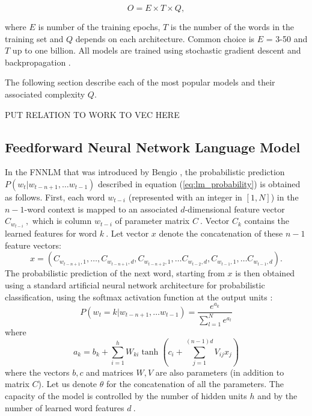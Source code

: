 \begin{center}
\begin{equation} O = E \times T \times Q,   \end{equation}
\end{center}

where $E$ is number of the training epochs, $T$ is the number of the words in
the training set and $Q$ depends on each architecture. Common choice is $E$ = 3-50 and $T$ up to one billion.
All models are trained using stochastic gradient descent and backpropagation
\cite{Bengio:2003:NPL:944919.944966,DBLP:journals/corr/abs-1301-3781}.

The following section describe each of the most popular models and their
associated complexity $Q$.


PUT RELATION TO WORK TO VEC HERE
\subsection{Feedforward Neural Network Language Model}
\label{subsec:fwd-neural-net-lm}


In the \ac{FNNLM} that was introduced by Bengio
\cite{Bengio:2003:NPL:944919.944966},  the probabilistic prediction $P(w_t | w_{t-n+1}, \ldots w_{t-1})$ described
in equation (\ref{eq:lm_probability}) is obtained as follows. First, each word $w_{t-i}$ (represented
with an integer in $[1,N]$) in the  $n-1$-word context is mapped
to an associated $d$-dimensional feature vector $C_{w_{t-i}}\ ,$ which is
column $w_{t-i}$ of parameter matrix $C\ .$ Vector $C_k$
contains the learned features for word $k\ .$
Let vector $x$ denote the concatenation of these $n-1$
feature vectors:
\begin{equation}
  x = (C_{w_{t-n+1},1}, \ldots, C_{w_{t-n+1},d}, C_{w_{t-n+2},1}, \ldots C_{w_{t-2},d}, C_{w_{t-1},1}, \ldots C_{w_{t-1},d}).
\end{equation}
The probabilistic prediction of the next word, starting from $x$
is then obtained using a standard artificial neural network architecture
for probabilistic classification, using the softmax activation function at the output units \cite{Bishop:1995:NNP:525960}:
\begin{equation}
 P(w_t=k | w_{t-n+1}, \ldots w_{t-1}) = \frac{e^{a_k}}{\sum_{l=1}^N e^{a_l}}
\end{equation}
where
\begin{equation}
 a_k = b_k + \sum_{i=1}^h W_{ki} \tanh(c_i + \sum_{j=1}^{(n-1)d} V_{ij} x_j)
\end{equation}
where the vectors $b,c$ and matrices $W,V$ are also
parameters (in addition to matrix $C$). Let us denote
$\theta$ for the concatenation of all the parameters.
The capacity of the model is controlled by the number of hidden units $h$
and by the number of learned word features $d\ .$ 


